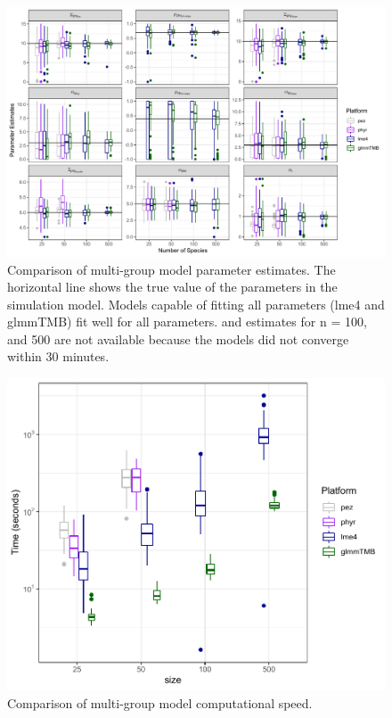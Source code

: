 \documentclass[12pt]{article}
\begin{document}
\begin{center}
\begin{figure}[H]
  \includegraphics[scale=0.7,page=1]{./figure/msplot.pdf}
  \caption{Comparison of multi-group model parameter estimates. The horizontal line shows the true value of the parameters in the simulation model. Models capable of fitting all parameters (lme4 and glmmTMB) fit well for all parameters.  and  estimates for n = 100, and 500 are not available because the models did not converge within 30 minutes. 
  }
  \label{msplot}
\end{figure}
\end{center}
\begin{center}
\begin{figure}[H]
  \includegraphics[scale=0.8]{./figure/mstime.pdf}
  \caption{Comparison of multi-group model computational speed.}
  \label{msplot_time}
\end{figure}
\end{center}
\end{document}
